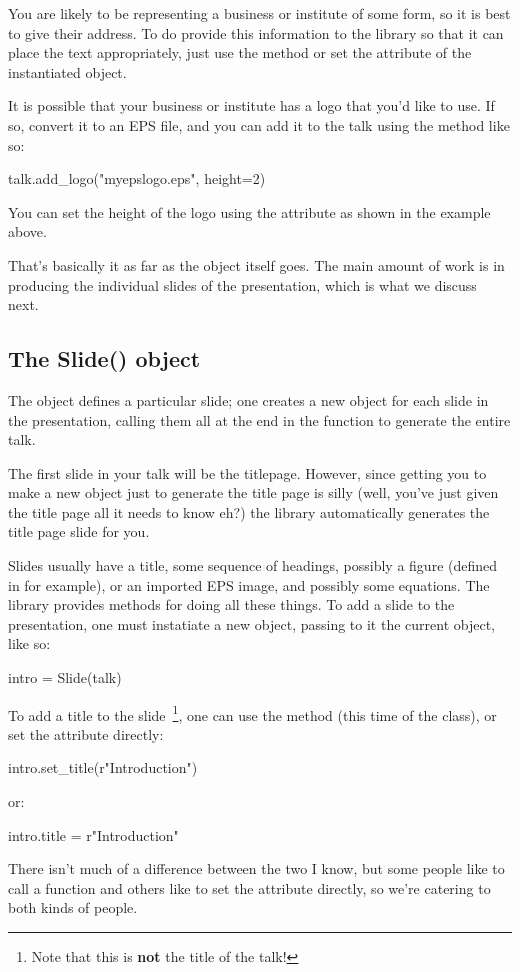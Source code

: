 You are likely to be representing a business or institute of some form, so
it is best to give their address.  To do provide this information to the
 library so that it can place the text appropriately, just
use the  method or set the  attribute of
the instantiated  object.

It is possible that your business or institute has a logo that you'd like to
use.  If so, convert it to an EPS file, and you can add it to the talk using
the  method like so:
\begin{python}
talk.add_logo("myepslogo.eps", height=2)
\end{python}
You can set the height of the logo using the  attribute as shown
in the example above.

That's basically it as far as the  object itself goes.  The main
amount of work is in producing the individual slides of the presentation,
which is what we discuss next.

\subsection{The Slide() object}

The  object defines a particular slide; one creates a new
 object for each slide in the presentation, calling them all at
the end in the  function to generate the entire talk.  

The first slide in your talk will be the titlepage.  However, since getting
you to make a new  object just to generate the title page is
silly (well, you've just given the title page all it needs to know eh?) the
library automatically generates the title page slide for you.

Slides usually have a title, some sequence of headings, possibly a figure
(defined in \pyscript for example), or an imported EPS image, and possibly
some equations.  The  library provides methods for doing
all these things.  To add a slide to the presentation, one must instatiate a
new  object, passing to it the current  object, like
so:
\begin{python}
intro = Slide(talk)
\end{python}

To add a title to the slide~\footnote{Note that this is
\textbf{not} the title of the talk!}, one can use the 
method (this time of the  class), or set the 
attribute directly:
\begin{python}
intro.set_title(r"Introduction")
\end{python}
or:
\begin{python}
intro.title = r"Introduction"
\end{python}
There isn't much of a difference between the two I know, but some people
like to call a  function and others like to set the attribute
directly, so we're catering to both kinds of people.

